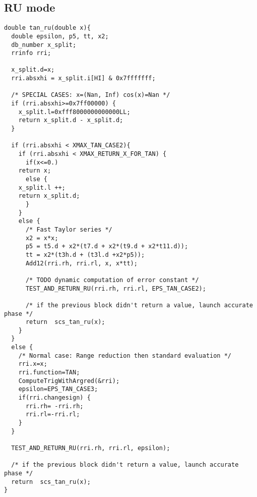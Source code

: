 \subsection{RU mode}
\begin{lstlisting}[caption={Exceptional cases for tangent RU},firstnumber=1]
double tan_ru(double x){  
  double epsilon, p5, tt, x2;
  db_number x_split;
  rrinfo rri;

  x_split.d=x;
  rri.absxhi = x_split.i[HI] & 0x7fffffff;
  
  /* SPECIAL CASES: x=(Nan, Inf) cos(x)=Nan */
  if (rri.absxhi>=0x7ff00000) {
    x_split.l=0xfff8000000000000LL;
    return x_split.d - x_split.d;
  }   
  
  if (rri.absxhi < XMAX_TAN_CASE2){
    if (rri.absxhi < XMAX_RETURN_X_FOR_TAN) {
      if(x<=0.)
	return x;
      else {
	x_split.l ++;
	return x_split.d;
      }
    }
    else {
      /* Fast Taylor series */
      x2 = x*x;
      p5 = t5.d + x2*(t7.d + x2*(t9.d + x2*t11.d));
      tt = x2*(t3h.d + (t3l.d +x2*p5));
      Add12(rri.rh, rri.rl, x, x*tt);  

      /* TODO dynamic computation of error constant */
      TEST_AND_RETURN_RU(rri.rh, rri.rl, EPS_TAN_CASE2);

      /* if the previous block didn't return a value, launch accurate phase */
      return  scs_tan_ru(x);
    }
  }
  else { 
    /* Normal case: Range reduction then standard evaluation */
    rri.x=x;
    rri.function=TAN;
    ComputeTrigWithArgred(&rri);
    epsilon=EPS_TAN_CASE3; 
    if(rri.changesign) {
      rri.rh= -rri.rh; 
      rri.rl=-rri.rl;
    }
  }
  
  TEST_AND_RETURN_RU(rri.rh, rri.rl, epsilon);

  /* if the previous block didn't return a value, launch accurate phase */
  return  scs_tan_ru(x);
}
\end{lstlisting}

